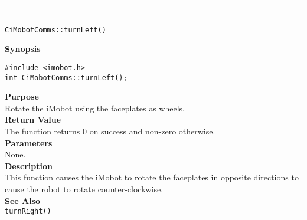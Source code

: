 \noindent
\vspace{5pt}
\rule{4.5in}{0.015in}\\
\noindent
{\LARGE \texttt{CiMobotComms::turnLeft()}}\\
{}

\noindent
{\bf Synopsis}\\
\begin{verbatim}
#include <imobot.h>
int CiMobotComms::turnLeft();
\end{verbatim}

\noindent
{\bf Purpose}\\
Rotate the iMobot using the faceplates as wheels.\\

\noindent
{\bf Return Value}\\
The function returns 0 on success and non-zero otherwise.\\

\noindent
{\bf Parameters}\\
None.\\

\noindent
{\bf Description}\\
This function causes the iMobot to rotate the faceplates in opposite directions
to cause the robot to rotate counter-clockwise.\\

\noindent
{\bf See Also}\\
\texttt{turnRight()}

